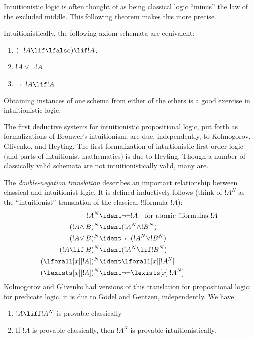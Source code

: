\documentclass[../../../include/open-logic-section]{subfiles}
\begin{document}
Intuitionistic logic is often thought of as being classical logic
``minus'' the law of the excluded middle. This following theorem makes
this more precise.
\begin{thm}
Intuitionistically, the following axiom schemata are equivalent:
\begin{enumerate}
\item $(\lnot !A \lif \lfalse) \lif !A$.
\item $!A \lor \lnot !A$
\item $\lnot \lnot !A \lif !A$
\end{enumerate}
\end{thm}
Obtaining instances of one schema from either of the others is a good
exercise in intuitionistic logic.

The first deductive systems for intuitionistic propositional
logic, put forth as formalizations of Brouwer's intuitionism, are due,
independently, to Kolmogorov, Glivenko, and Heyting. The first
formalization of intuitionistic first-order logic (and parts of
intuitionist mathematics) is due to Heyting. Though a number of
classically valid schemata are not intuitionistically valid, many are.

The \emph{double-negation translation} describes an important
relationship between classical and intuitionist logic. It is defined
inductively follows (think of $!A^N$ as the ``intuitionist''
translation of the classical !!{formula}~$!A$):
\begin{align*}
!A^N & \ident \lnot\lnot !A \quad \text{for atomic !!{formula}s $!A$} \\
(!A \land !B)^N & \ident (!A^N \land !B^N) \\
(!A \lor !B)^N & \ident  \lnot\lnot (!A^N \lor !B^N) \\
(!A \lif !B)^N & \ident (!A^N \lif !B^N) \\
(\lforall[x][!A])^N & \ident \lforall[x][!A^N] \\
(\lexists[x][!A])^N & \ident \lnot\lnot\lexists[x][!A^N]
\end{align*}
Kolmogorov and Glivenko had versions of this translation for
propositional logic; for predicate logic, it is due to G\"odel and
Gentzen, independently. We have

\begin{thm}
\begin{enumerate}
\item $!A \liff !A^N$ is provable classically
\item If $!A$ is provable classically, then $!A^N$ is provable
  intuitionistically.
\end{enumerate}
\end{thm}
\end{document}

